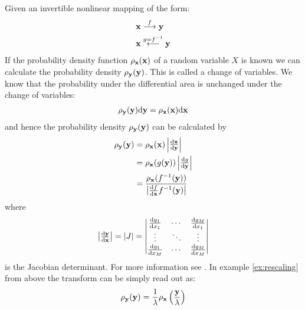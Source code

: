 \begin{proposition}
Given an invertible nonlinear mapping of the form:
\begin{align*}
	\mathbf{x} &  \stackrel{f}{\longrightarrow} \mathbf{y} \\
	\mathbf{x} &  \stackrel{g = f^{-1}}{\longleftarrow} \mathbf{y}
\end{align*}
If the probability density function $\rho_{\mathbf{x}}(\mathbf{x})$ of a random variable 
$X$ is known we can calculate the
probability density $\rho_{\mathbf{y}}(\mathbf{y})$. This is called a change of variables.
We know that the probability under the differential area is unchanged under the 
change of variables:
\begin{align}
	\rho_{\mathbf{y}}(\mathbf{y}) \mathrm{d}\mathbf{y} = \rho_{\mathbf{x}}(\mathbf{x}) \mathrm{d}\mathbf{x}
\end{align}
and hence the probability density $\rho_{\mathbf{y}}(\mathbf{y})$ can be calculated by
\begin{align}
	\begin{split}
	\rho_{\mathbf{y}}(\mathbf{y}) 
	&= \rho_{\mathbf{x}}(\mathbf{x})  \begin{vmatrix}\frac{\mathrm{d}\mathbf{x}}{\mathrm{d}\mathbf{y}}\end{vmatrix} \\
	&= \rho_{\mathbf{x}}(g(\mathbf{y})) \begin{vmatrix}\frac{\mathrm{d}g}{\mathrm{d}\mathbf{y}}\end{vmatrix} \\
	&= \frac{\rho_{\mathbf{x}}(f^{-1}(\mathbf{y}))}{\begin{vmatrix}\frac{\mathrm{d}f}{\mathrm{d}\mathbf{x}} f^{-1}(\mathbf{y})\end{vmatrix}}	
	\end{split}
\end{align}
where
\begin{align}
	\begin{vmatrix}\frac{\mathrm{d}\mathbf{y}}{\mathrm{d}\mathbf{x}}\end{vmatrix}
	    = |J|
	    = \begin{vmatrix}
	    	\frac{\mathrm{d}y_1}{\mathrm{d}x_1} & \cdots & \frac{\mathrm{d}y_M}{\mathrm{d}x_1} \\
	    	\vdots & \ddots & \vdots \\
	    	\frac{\mathrm{d}y_1}{\mathrm{d}x_M} & \cdots & \frac{\mathrm{d}y_M}{\mathrm{d}x_M} \\
	    \end{vmatrix}
\end{align}
is the Jacobian determinant. For more information see \cite[p.18, p.247]{Bishop2006}. In example
\ref{ex:rescaling} from above the transform can be simply read out as:
\begin{align}
	\rho_{\mathbf{y}}(\mathbf{y}) = \frac{1}{\lambda} 	\rho_{\mathbf{x}} \left( \frac{\mathbf{y}}{\lambda} \right)
\end{align}
\end{proposition}

